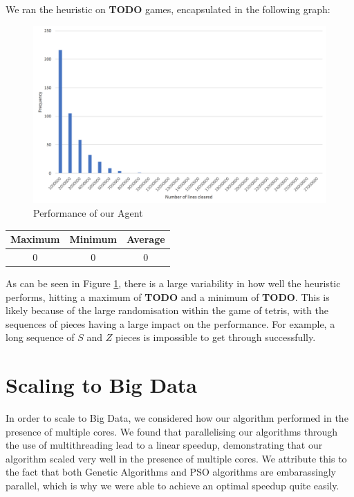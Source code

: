 \documentclass{article}
\begin{document}
We ran the heuristic on \textbf{TODO} games, encapsulated in the following graph:

\begin{figure}[h]
	\includegraphics[scale=0.4]{heuristic/heuristic}
	\centering
	\caption{Performance of our Agent}
	\label{fig:agent}
\end{figure}

\begin{center}
	\begin{tabular}{ | c | c | c | }
		\hline
		Maximum & Minimum & Average \\ \hline
		0 & 0 & 0 \\ \hline
	\end{tabular}
\end{center}

As can be seen in Figure \ref{fig:agent}, there is a large variability in how
well the heuristic performs, hitting a maximum of \textbf{TODO} and a minimum
of \textbf{TODO}.  This is likely because of the large randomisation within the
game of tetris, with the sequences of pieces having a large impact on the
performance. For example, a long sequence of $S$ and $Z$ pieces is impossible
to get through successfully.

\section{Scaling to Big Data}
In order to scale to Big Data, we considered how our algorithm performed in the
presence of multiple cores. We found that parallelising our algorithms through
the use of multithreading lead to a linear speedup, demonstrating that our
algorithm scaled very well in the presence of multiple cores. We attribute this
to the fact that both Genetic Algorithms and PSO algorithms are embarassingly
parallel, which is why we were able to achieve an optimal speedup quite easily.
\end{document}
